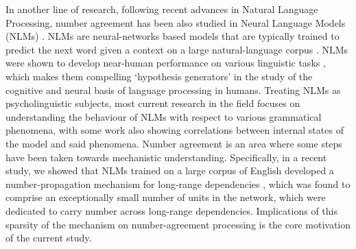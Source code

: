 In another line of research, following recent advances in Natural Language Processing, number agreement has been also studied in Neural Language Models (NLMs) \citep{Linzen:etal:2016}. NLMs are neural-networks based models that are typically trained to predict the next word given a context on a large natural-language corpus \citep{Elman:1991}. NLMs were shown to develop near-human performance on various linguistic tasks \citep{}, which makes them compelling `hypothesis generators' in the study of the cognitive and neural basis of language processing in humans. Treating NLMs as psycholinguistic subjects, most current research in the field focuses on understanding the behaviour of NLMs with respect to various grammatical phenomena, with some work also showing correlations between internal states of the model and said phenomena. Number agreement is an area where some steps have been taken towards mechanistic understanding. Specifically, in a recent study, we showed that NLMs trained on a large corpus of English developed a number-propagation mechanism for long-range dependencies \citep{lakretz2019emergence}, which was found to comprise an exceptionally small number of units in the network, which were dedicated to carry number across long-range dependencies. Implications of this sparsity of the mechanism on number-agreement processing is the core motivation of the current study.